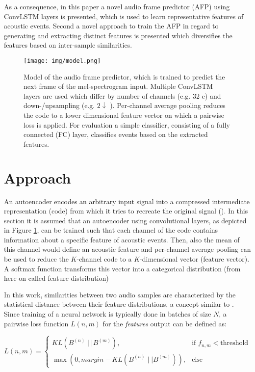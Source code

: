 \documentclass{article} %
\begin{document}
As a consequence, in this paper a novel audio frame predictor (AFP) using ConvLSTM layers is presented, which is used to learn representative features of acoustic events. Second a novel approach to train the AFP in regard to generating and extracting distinct features is presented which diversifies the features based on inter-sample similarities.

\begin{figure}[h]
	\begin{center}
		\texttt{[image: img/model.png]}
	\end{center}
	\caption{Model of the audio frame predictor, which is trained to predict the next frame of the mel-spectrogram input. Multiple ConvLSTM layers are used which differ by number of channels (e.g. 32 c) and down-/upsampling (e.g. $2\downarrow$ ). 
	Per-channel average pooling reduces the code to a lower dimensional feature vector on which a pairwise loss is applied. For evaluation a simple classifier, consisting of a fully connected (FC) layer, classifies events based on the extracted features.}
	\label{fig_model}
\end{figure}


\section{Approach}
An autoencoder encodes an arbitrary input signal into a compressed intermediate representation (code) from which it tries to recreate the original signal (\cite{hinton_reducing_2006}).
In this section it is assumed that an autoencoder using convolutional layers, as depicted in Figure \ref{fig_model}, can be trained such that each channel of the code contains information about a specific feature of acoustic events. Then, also the mean of this channel would define an acoustic feature and per-channel average pooling can be used to reduce the $K$-channel code to a $K$-dimensional vector (feature vector). A softmax function transforms this vector into a categorical distribution (from here on called feature distribution)

In this work, similarities between two audio samples are characterized by the statistical distance between their feature distributions, a concept similar to \cite{hsu_neural_2015}. Since training of a neural network is typically done in batches of size $N$, a pairwise loss function $L(n,m)$ for the \emph{features} output can be defined as:


\begin{equation}
L(n,m) = 
\begin{cases}
\mathit{KL}(B^{(n)} \mid\mid B^{(m)}), & \text{if } f_{n,m} < \text{threshold} \\
\max( 0, \mathit{margin} -KL(B^{(n)} \mid\mid B^{(m)})), & \text{else}
\end{cases}
\end{equation}
\end{document}
